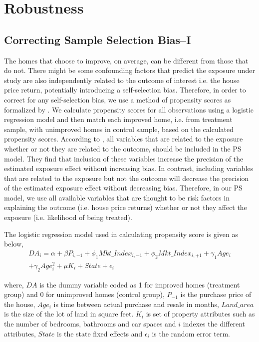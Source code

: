 \documentclass[AEJ,reqno, draftmode]{AEA} %
\begin{document}
\section{Robustness}

\subsection{Correcting Sample Selection Bias--I}

The homes that choose to improve, on average, can be different from those that do not. There might be some confounding factors that predict the exposure under study are also independently related to the outcome of interest i.e. the house price return, potentially introducing a self-selection bias. Therefore, in order to correct for any self-selection bias, we use a method of propensity scores as formalized by \cite{rosenbaum1983central}. We calculate propensity scores for all observations using a logistic regression model and then match each improved home, i.e. from treatment sample, with unimproved homes in control sample, based on the calculated propensity scores. According to \citet{brookhart2006variable}, all variables that are related to the exposure whether or not they are related to the outcome, should be included in the PS model. They find that inclusion of these variables increase the precision of the estimated exposure effect without increasing bias. In contrast, including variables that are related to the exposure but not the outcome will decrease the precision of the estimated exposure effect without decreasing bias. Therefore, in our PS model, we use all available variables that are thought to be risk factors in explaining the outcome (i.e. house price returns) whether or not they affect the exposure (i.e. likelihood of being treated).

The logistic regression model used in calculating propensity score is given as below, \begin{equation} \label{eqn:logistic}
\begin{aligned}
    DA_i = \alpha + \beta{P_{i,-1}}  + \phi_1{Mkt\_Index_{i,-1}} + \phi_2{Mkt\_Index_{i,+1}} + \gamma_1{Age_i} \\+ \gamma_2{Age_i^2} +  \mu{K_i} + State + \epsilon_i
\end{aligned}
\end{equation}

where, $DA$ is the dummy variable coded as 1 for improved homes (treatment group) and 0 for unimproved homes (control group), $P_{-1}$ is the purchase price of the house, $Age_i$ is time between actual purchase and resale in months, $Land\_area$ is the size of the lot of land in square feet. $K_i$ is set of property attributes such as the number of bedrooms, bathrooms and car spaces and $i$ indexes the different attributes, $State$ is the state fixed effects and $\epsilon_i$ is the random error term. 
    
\end{document}
